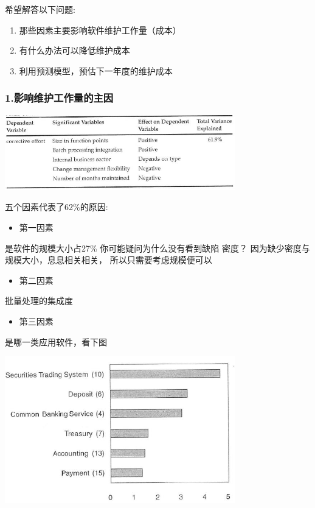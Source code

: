 希望解答以下问题:

\begin{enumerate}
\tightlist
\item
  那些因素主要影响软件维护工作量（成本）
\item
  有什么办法可以降低维护成本
\item
  利用预测模型，预估下一年度的维护成本
\end{enumerate}

\hypertarget{ux5f71ux54cdux7ef4ux62a4ux5de5ux4f5cux91cfux7684ux4e3bux56e0}{%
\subsubsection{1.影响维护工作量的主因}\label{ux5f71ux54cdux7ef4ux62a4ux5de5ux4f5cux91cfux7684ux4e3bux56e0}}


\includegraphics[width=10cm]{maxwell_t54.jpg}

五个因素代表了62\%的原因:

\begin{itemize}
\tightlist
\item
  第一因素
\end{itemize}

是软件的规模大小占27\% 你可能疑问为什么没有看到缺陷 密度？
因为缺少密度与规模大小，息息相关相关， 所以只需要考虑规模便可以

\begin{itemize}
\tightlist
\item
  第二因素
\end{itemize}

批量处理的集成度

\begin{itemize}
\tightlist
\item
  第三因素
\end{itemize}

是哪一类应用软件，看下图


\includegraphics[width=10cm]{maxwell_f52.jpg}

